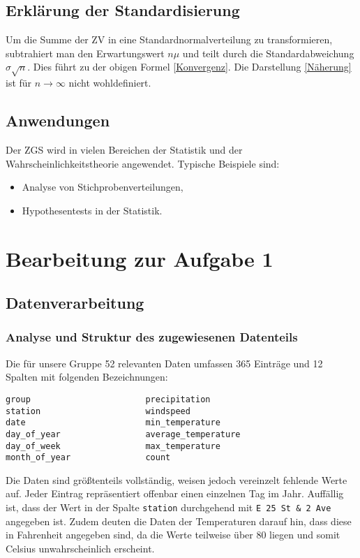 \documentclass{article}
\begin{document}
\subsection{Erklärung der Standardisierung}

Um die Summe der ZV in eine Standardnormalverteilung zu transformieren, subtrahiert man den Erwartungswert $n\mu$ und teilt durch die Standardabweichung $\sigma \sqrt{n}$. Dies führt zu der obigen Formel \eqref{Konvergenz}. Die Darstellung \eqref{Näherung} ist für $n \to \infty$ nicht wohldefiniert.


\subsection{Anwendungen}

Der ZGS wird in vielen Bereichen der Statistik und der Wahrscheinlichkeitstheorie angewendet. Typische Beispiele sind:
\begin{itemize}
    \item Analyse von Stichprobenverteilungen,
    \item Hypothesentests in der Statistik.
\end{itemize}


\newpage
\section{Bearbeitung zur Aufgabe 1}
\subsection{Datenverarbeitung}
\subsubsection{Analyse und Struktur des zugewiesenen Datenteils}

Die für unsere Gruppe 52 relevanten Daten umfassen 365 Einträge und 12 Spalten mit folgenden Bezeichnungen:

\begin{lstlisting}
group                       precipitation
station                     windspeed
date                        min_temperature
day_of_year                 average_temperature
day_of_week                 max_temperature
month_of_year               count
\end{lstlisting}

Die Daten sind größtenteils vollständig, weisen jedoch vereinzelt fehlende Werte auf. Jeder Eintrag repräsentiert offenbar einen einzelnen Tag im Jahr. Auffällig ist, dass der Wert in der Spalte \texttt{station} durchgehend mit \texttt{E 25 St \& 2 Ave} angegeben ist. Zudem deuten die Daten der Temperaturen darauf hin, dass diese in Fahrenheit angegeben sind, da die Werte teilweise über 80 liegen und somit Celsius unwahrscheinlich erscheint.
\end{document}
